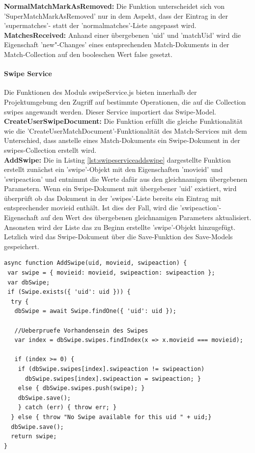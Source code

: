 \noindent
\textbf{NormalMatchMarkAsRemoved:}
Die Funktion unterscheidet sich von 'SuperMatchMarkAsRemoved' nur in dem Aspekt, dass der  Eintrag in der 'supermatches'- statt der 'normalmatches'-Liste angepasst wird.\\

\noindent
\textbf{MatchesReceived:}
Anhand einer übergebenen 'uid' und 'matchUid' wird die Eigenschaft 'new"-Changes' eines entsprechenden Match-Dokuments in der Match-Collection auf den booleschen Wert false gesetzt. 



%
%

\paragraph{Swipe Service}
Die Funktionen des Moduls swipeService.js bieten innerhalb der Projektumgebung den Zugriff auf bestimmte Operationen, die auf die Collection swipes angewandt werden. Dieser Service importiert das Swipe-Model.\\

\noindent
\textbf{CreateUserSwipeDocument:}
Die Funktion erfüllt die gleiche Funktionalität wie die 'Create\-UserMatchDocument'-Funktionalität des Match-Services mit dem Unterschied, dass anstelle eines Match-Dokuments ein Swipe-Dokument in der swipes-Collection erstellt wird.\\

\noindent
\textbf{AddSwipe:}
Die in Listing \ref{lst:swipeserviceaddswipe} dargestellte Funktion erstellt zunächst ein 'swipe'-Objekt mit den Eigenschaften 'movieid' und 'swipeaction' und entnimmt die Werte dafür aus den gleichnamigen übergebenen Parametern. 
Wenn ein Swipe-Dokument mit übergebener 'uid' existiert, wird überprüft ob das Dokument in der 'swipes'-Liste bereits ein Eintrag mit entsprechender movieid enthält. Ist dies der Fall, wird die 'swipeaction'-Eigenschaft auf den Wert des übergebenen gleichnamigen Parameters aktualisiert. Ansonsten wird der Liste das zu Beginn erstellte 'swipe'-Objekt hinzugefügt. Letzlich wird das Swipe-Dokument über die Save-Funktion des Save-Models gespeichert.\\

\begin{lstlisting}[caption=Swipe Service - AddSwipe, label=lst:swipeserviceaddswipe]
async function AddSwipe(uid, movieid, swipeaction) {
 var swipe = { movieid: movieid, swipeaction: swipeaction };
 var dbSwipe;
 if (Swipe.exists({ 'uid': uid })) {
  try {
   dbSwipe = await Swipe.findOne({ 'uid': uid });

   //Ueberpruefe Vorhandensein des Swipes
   var index = dbSwipe.swipes.findIndex(x => x.movieid === movieid);

   if (index >= 0) {
    if (dbSwipe.swipes[index].swipeaction != swipeaction)
      dbSwipe.swipes[index].swipeaction = swipeaction; }
    else { dbSwipe.swipes.push(swipe); }
    dbSwipe.save(); 
    } catch (err) { throw err; }
  } else { throw "No Swipe available for this uid " + uid;}
  dbSwipe.save();
  return swipe;
}
\end{lstlisting}

